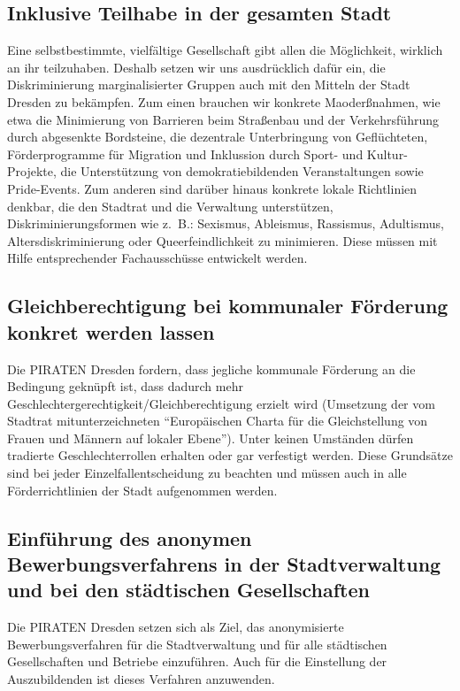 \documentclass[a4paper, 11pt]{article}
\begin{document}
\subsection{Inklusive Teilhabe in der gesamten Stadt}
Eine selbstbestimmte, vielfältige Gesellschaft gibt allen die Möglichkeit, wirklich an ihr teilzuhaben. Deshalb setzen wir uns ausdrücklich dafür ein, die Diskriminierung marginalisierter Gruppen auch mit den Mitteln der Stadt Dresden zu bekämpfen. Zum einen brauchen wir konkrete Maoderßnahmen, wie etwa die Minimierung von Barrieren beim Straßenbau und der Verkehrsführung durch abgesenkte Bordsteine, die dezentrale Unterbringung von Geflüchteten, Förderprogramme für Migration und Inklussion durch Sport- und Kultur-Projekte, die Unterstützung von demokratiebildenden Veranstaltungen sowie Pride-Events. Zum anderen sind darüber hinaus konkrete lokale Richtlinien denkbar, die den Stadtrat und die Verwaltung unterstützen, Diskriminierungsformen wie z. B.: Sexismus, Ableismus, Rassismus, Adultismus, Altersdiskriminierung oder Queerfeindlichkeit zu minimieren. Diese müssen mit Hilfe entsprechender Fachausschüsse entwickelt werden.


\subsection{Gleichberechtigung bei kommunaler Förderung konkret werden lassen}
Die PIRATEN Dresden fordern, dass jegliche kommunale Förderung an die Bedingung geknüpft ist, dass dadurch mehr Geschlechtergerechtigkeit/Gleichberechtigung erzielt wird (Umsetzung der vom Stadtrat mitunterzeichneten ``Europäischen Charta für die Gleichstellung von Frauen und Männern auf lokaler Ebene''). Unter keinen Umständen dürfen tradierte Geschlechterrollen erhalten oder gar verfestigt werden. Diese Grundsätze sind bei jeder Einzelfallentscheidung zu beachten und müssen auch in alle Förderrichtlinien der Stadt aufgenommen werden.



\subsection{Einführung des anonymen Bewerbungsverfahrens in der Stadtverwaltung und bei den städtischen Gesellschaften}
Die PIRATEN Dresden setzen sich als Ziel, das anonymisierte Bewerbungsverfahren für die Stadtverwaltung und für alle städtischen Gesellschaften und Betriebe einzuführen. Auch für die Einstellung der Auszubildenden ist dieses Verfahren anzuwenden.
\end{document}
